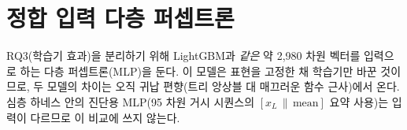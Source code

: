 
\section{정합 입력 다층 퍼셉트론}
\label{sec:model-mlp}

RQ3(학습기 효과)을 분리하기 위해 LightGBM과 \emph{같은} 약 2{,}980 차원 벡터를 입력으로 하는 다층 퍼셉트론(MLP)을 둔다. 이 모델은 표현을 고정한 채 학습기만 바꾼 것이므로, 두 모델의 차이는 오직 귀납 편향(트리 앙상블 대 매끄러운 함수 근사)에서 온다. 심층 하네스 안의 진단용 MLP(95 차원 거시 시퀀스의 $[x_L \,\|\, \mathrm{mean}]$ 요약 사용)는 입력이 다르므로 이 비교에 쓰지 않는다.
